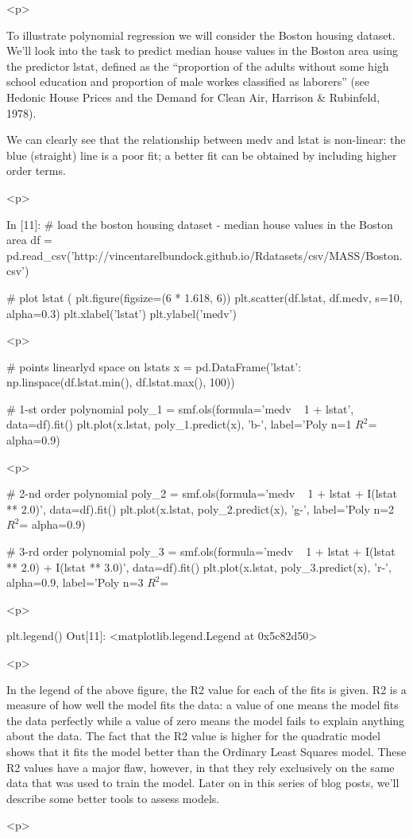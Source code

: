 <p>

	
To illustrate polynomial regression we will consider the Boston housing dataset. We’ll look into the task to predict median house values in the Boston area using the predictor lstat, defined as the “proportion of the adults without some high school education and proportion of male workes classified as laborers” (see Hedonic House Prices and the Demand for Clean Air, Harrison & Rubinfeld, 1978).

We can clearly see that the relationship between medv and lstat is non-linear: the blue (straight) line is a poor fit; a better fit can be obtained by including higher order terms.


<p>

	
In [11]:
# load the boston housing dataset - median house values in the Boston area
df = pd.read_csv('http://vincentarelbundock.github.io/Rdatasets/csv/MASS/Boston.csv')

# plot lstat (%
plt.figure(figsize=(6 * 1.618, 6))
plt.scatter(df.lstat, df.medv, s=10, alpha=0.3)
plt.xlabel('lstat')
plt.ylabel('medv')


<p>

	
# points linearlyd space on lstats
x = pd.DataFrame({'lstat': np.linspace(df.lstat.min(), df.lstat.max(), 100)})

# 1-st order polynomial
poly_1 = smf.ols(formula='medv ~ 1 + lstat', data=df).fit()
plt.plot(x.lstat, poly_1.predict(x), 'b-', label='Poly n=1 $R^2$=%
         alpha=0.9)


<p>

	
# 2-nd order polynomial
poly_2 = smf.ols(formula='medv ~ 1 + lstat + I(lstat ** 2.0)', data=df).fit()
plt.plot(x.lstat, poly_2.predict(x), 'g-', label='Poly n=2 $R^2$=%
         alpha=0.9)

# 3-rd order polynomial
poly_3 = smf.ols(formula='medv ~ 1 + lstat + I(lstat ** 2.0) + I(lstat ** 3.0)', data=df).fit()
plt.plot(x.lstat, poly_3.predict(x), 'r-', alpha=0.9,
         label='Poly n=3 $R^2$=%


<p>

	
plt.legend()
Out[11]:
<matplotlib.legend.Legend at 0x5c82d50>


<p>

	
In the legend of the above figure, the R2 value for each of the fits is given. R2 is a measure of how well the model fits the data: a value of one means the model fits the data perfectly while a value of zero means the model fails to explain anything about the data. The fact that the R2 value is higher for the quadratic model shows that it fits the model better than the Ordinary Least Squares model. These R2 values have a major flaw, however, in that they rely exclusively on the same data that was used to train the model. Later on in this series of blog posts, we’ll describe some better tools to assess models.


<p>

